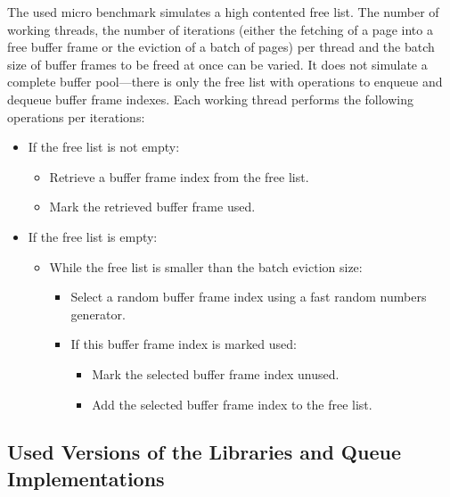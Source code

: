     The used micro benchmark simulates a high contented free list. The number of working threads, the number of iterations (either the fetching of a page into a free buffer frame or the eviction of a batch of pages) per thread and the batch size of buffer frames to be freed at once can be varied. It does not simulate a complete buffer pool---there is only the free list with operations to enqueue and dequeue buffer frame indexes. Each working thread performs the following operations per iterations:

\begin{@empty}
    \begin{itemize}
        \itemsep0em
        \item If the free list is not empty:
        \begin{itemize}
            \item Retrieve a buffer frame index from the free list.
            \item Mark the retrieved buffer frame used.
        \end{itemize}
        \item If the free list is empty:
        \begin{itemize}
            \item While the free list is smaller than the batch eviction size:
            \begin{itemize}
                \item Select a random buffer frame index using a fast random numbers generator.
                \item If this buffer frame index is marked used:
                \begin{itemize}
                    \item Mark the selected buffer frame index unused.
                    \item Add the selected buffer frame index to the free list.
                \end{itemize}
            \end{itemize}
        \end{itemize}
    \end{itemize}
\end{@empty}

\subsection[Queue Versions]{Used Versions of the Libraries and Queue Implementations}

